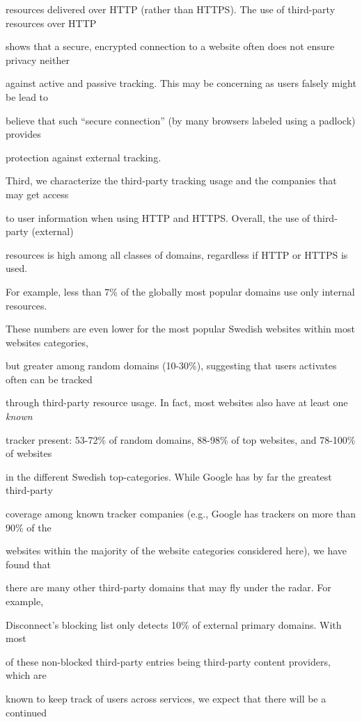 \documentclass{sig-alternate-10pt}
\begin{document}
resources delivered over HTTP (rather than HTTPS).  The use of third-party resources over HTTP 

shows that a secure, encrypted connection to a website often does not ensure privacy neither 

against active and passive tracking.  This may be concerning as users falsely might be lead to 

believe that such “secure connection” (by many browsers labeled using a padlock) provides 

protection against external tracking.



Third, we characterize the third-party tracking usage and the companies that may get access 

to user information when using HTTP and HTTPS.  Overall, the use of third-party (external) 

resources is high among all classes of domains, regardless if HTTP or HTTPS is used.  

For example, less than 7\% of the globally most popular domains use only internal resources.  

These numbers are even lower for the most popular Swedish websites within most websites categories, 

but greater among random domains (10-30\%), suggesting that users activates often can be tracked 

through third-party resource usage.  In fact, most websites also have at least one {\em known} 

tracker present: 53-72\% of random domains, 88-98\% of top websites, and 78-100\% of websites 

in the different Swedish top-categories.  While Google has by far the greatest third-party 

coverage among known tracker companies (e.g., Google has trackers on more than 90\% of the 

websites within the majority of the website categories considered here), we have found that 

there are many other third-party domains that may fly under the radar.  For example, 

Disconnect's blocking list only detects 10\% of external primary domains.  With most 

of these non-blocked third-party entries being third-party content providers, which are 

known to keep track of users across services, we expect that there will be a continued 
\end{document}

